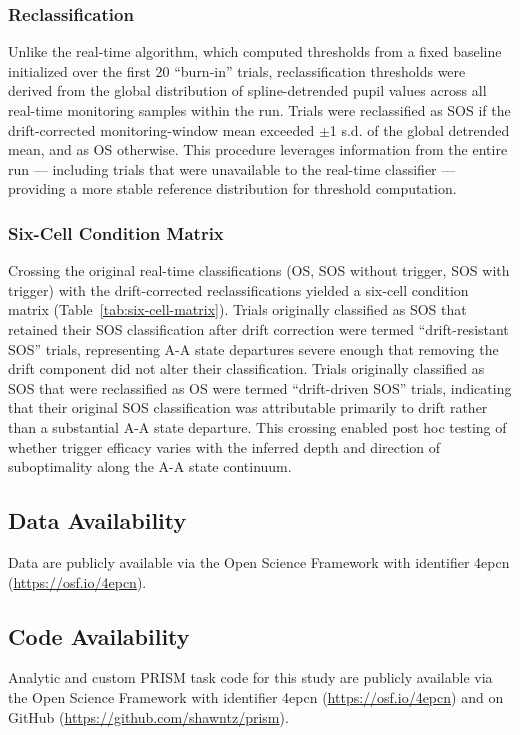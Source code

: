\subsubsection{Reclassification}

Unlike the real-time algorithm, which computed thresholds from a fixed baseline initialized over the first 20 ``burn-in'' trials, reclassification thresholds were derived from the global distribution of spline-detrended pupil values across all real-time monitoring samples within the run. Trials were reclassified as SOS if the drift-corrected monitoring-window mean exceeded $\pm$1 s.d. of the global detrended mean, and as OS otherwise. This procedure leverages information from the entire run — including trials that were unavailable to the real-time classifier — providing a more stable reference distribution for threshold computation.

\subsubsection{Six-Cell Condition Matrix}

Crossing the original real-time classifications (OS, SOS without trigger, SOS with trigger) with the drift-corrected reclassifications yielded a six-cell condition matrix (Table~\ref{tab:six-cell-matrix}). Trials originally classified as SOS that retained their SOS classification after drift correction were termed ``drift-resistant SOS'' trials, representing A-A state departures severe enough that removing the drift component did not alter their classification. Trials originally classified as SOS that were reclassified as OS were termed ``drift-driven SOS'' trials, indicating that their original SOS classification was attributable primarily to drift rather than a substantial A-A state departure. This crossing enabled post hoc testing of whether trigger efficacy varies with the inferred depth and direction of suboptimality along the A-A state continuum.

\subsection{Data Availability}

Data are publicly available via the Open Science Framework with identifier 4epcn (\url{https://osf.io/4epcn}). 

\subsection{Code Availability}

Analytic and custom PRISM task code for this study are publicly available via the Open Science Framework with identifier 4epcn (\url{https://osf.io/4epcn}) and on GitHub (\url{https://github.com/shawntz/prism}). 
